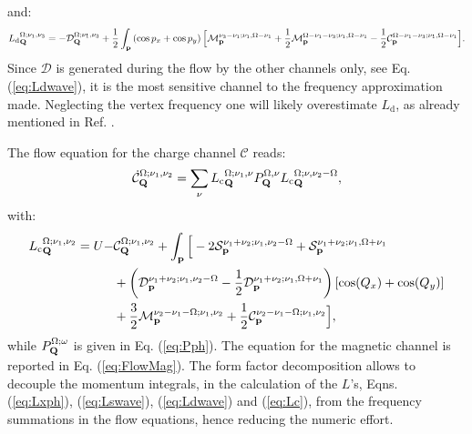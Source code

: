 and: 
\begin{align} 
\label{eq:Ldwave}
{L_\mathrm{d}}^{\Omega;\nu_1,\nu_3}_{\mathbf{Q}}=-\mathcal{D}_{\mathbf{Q}}^{\Omega;\nu_1,\nu_3} 
+ \frac{1}{2}\int_{\mathbf{p}} \left(\cos{p_x}+\cos{p_y}\right) \Big[ \mathcal{M}_{\mathbf{p}}^{\nu_3-\nu_1;\nu_1,\Omega-\nu_1} + \frac{1}{2} \mathcal{M}_{\mathbf{p}}^{\Omega-\nu_1-\nu_3;\nu_1,\Omega-\nu_1} - \frac{1}{2} \mathcal{C}_{\mathbf{p}}^{\Omega-\nu_1-\nu_3;\nu_1,\Omega-\nu_1} \Big].
\end{align}	 
Since $\mathcal{D}$ is generated during the flow by the other channels only, see Eq. (\ref{eq:Ldwave}), it is the most sensitive channel to the frequency approximation made.  
Neglecting the vertex frequency one will likely overestimate $L_{\mathrm{d}}$, as already mentioned in Ref. .

The flow equation for the charge channel $\mathcal{C}$ reads:
\begin{equation}
\dot{\mathcal{C}}_{\mathbf{Q}}^{\Omega;\nu_1,\nu_2} = \sum_{\nu}{L_\mathrm{c}}^{\Omega; \nu_1,\nu}_{\mathbf{Q}} P_{\mathbf{Q}}^{\Omega,\nu} {L_\mathrm{c}}^{\Omega; \nu,\nu_2-\Omega}_{\mathbf{Q}}, 
\end{equation} 	   
with: 
 \begin{align} 
 \label{eq:Lc}
{L_\mathrm{c}}^{\Omega;\nu_1,\nu_2}_{\mathbf{Q}}=U-&\mathcal{C}_{\mathbf{Q}}^{\Omega;\nu_1,\nu_2} 
+ \int_{\mathbf{p}} \Big [
- 2 \mathcal{S}_{\mathbf{p}}^{\nu_1+\nu_2;\nu_1,\nu_2-\Omega} + \mathcal{S}_{\mathbf{p}}^{\nu_1+\nu_2;\nu_1,\Omega+\nu_1}
\\ &+ \left( \mathcal{D}_{\mathbf{p}}^{\nu_1+\nu_2;\nu_1,\nu_2-\Omega} -\frac{1}{2} \mathcal{D}_{\mathbf{p}}^{\nu_1+\nu_2;\nu_1,\Omega+\nu_1} \right) [\cos(Q_x)+\cos(Q_y)]
\\ &+ \frac{3}{2} \mathcal{M}_{\mathbf{p}}^{\nu_2-\nu_1-\Omega;\nu_1,\nu_2} 
+ \frac{1}{2} \mathcal{C}_{\mathbf{p}}^{\nu_2-\nu_1-\Omega;\nu_1,\nu_2} \Big],
\end{align}
while $P_{\mathbf{Q}}^{\Omega;\omega}$ is given in Eq. (\ref{eq:Pph}).
The equation for the magnetic channel is reported in Eq. (\ref{eq:FlowMag}).
The form factor decomposition allows to decouple the momentum integrals, in the calculation of the $L$'s, Eqns. (\ref{eq:Lxph}), (\ref{eq:Lswave}), (\ref{eq:Ldwave}) and (\ref{eq:Lc}), from the frequency summations in the flow equations, hence reducing the numeric effort.   	 


